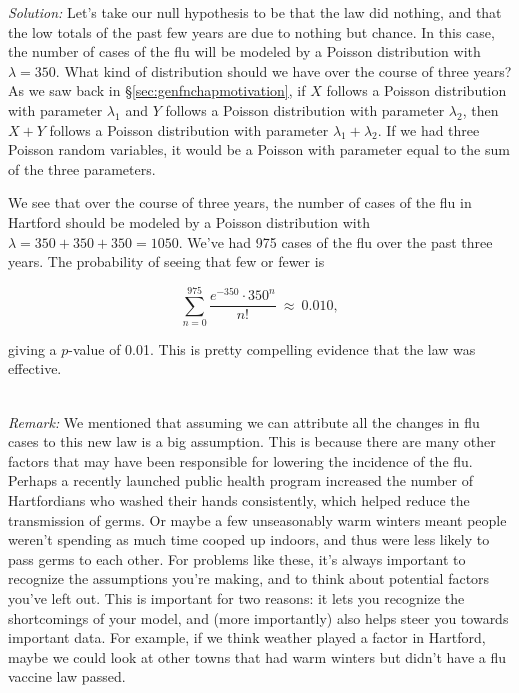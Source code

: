 \emph{Solution:} Let's take our null hypothesis to be that the law did nothing, and that the low totals of the past few years are due to nothing but chance.  In this case, the number of cases of the flu will be modeled by a Poisson distribution with $\lambda = 350$. What kind of distribution should we have over the course of three years?  As we saw back in \S\ref{sec:genfnchapmotivation}, if $X$ follows a Poisson distribution with parameter $\lambda_1$ and $Y$ follows a Poisson distribution with parameter $\lambda_2$, then $X+Y$ follows a Poisson distribution with parameter $\lambda_1 + \lambda_2$. If we had three Poisson random variables, it would be a Poisson with parameter equal to the sum of the three parameters.



We see that over the course of three years, the number of cases of the flu in Hartford should be modeled by a Poisson distribution with $\lambda = 350 + 350 + 350 = 1050$.  We've had 975 cases of the flu over the past three years.  The probability of seeing that few or fewer is

\begin{equation*}

	\sum_{n=0}^{975}{\frac{e^{-350}\cdot350^n}{n!}}\ \approx \  0.010,

	\end{equation*}

giving a $p$-value of 0.01.  This is pretty compelling evidence that the law was effective.



\ \\



\emph{Remark:} \nb We mentioned that assuming we can attribute all the changes in flu cases to this new law is a big assumption.  This is because there are many other factors that may have been responsible for lowering the incidence of the flu.  Perhaps a recently launched public health program increased the number of Hartfordians who washed their hands consistently, which helped reduce the transmission of germs.  Or maybe a few unseasonably warm winters meant people weren't spending as much time cooped up indoors, and thus were less likely to pass germs to each other.  For problems like these, it's always important to recognize the assumptions you're making, and to think about potential factors you've left out.  This is important for two reasons: it lets you recognize the shortcomings of your model, and (more importantly) also helps steer you towards important data.  For example, if we think weather played a factor in Hartford, maybe we could look at other towns that had warm winters but didn't have a flu vaccine law passed.



